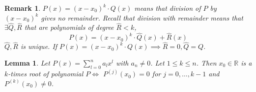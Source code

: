 \documentclass{article}
\newtheorem{lemma}{Lemma}  \numberwithin{lemma}{section}
\newtheorem{remark}{Remark}  \numberwithin{remark}{section}
\begin{document}
\begin{remark}
  $P(x) = (x - x_0)^k \cdot Q(x)$ means that division of $P$ by $(x - x_0)^k$ gives no remainder.
  Recall that division with remainder means that $\exists \hat Q, \hat R$ that are polynomials of degree $\hat R < k$,
  \[ P(x) = (x - x_0)^k \cdot \hat Q(x) + \hat R(x) \]
  $\hat Q, \hat R$ is unique.
  If $P(x) = (x - x_0)^k \cdot Q(x) \implies \hat R = 0, \hat Q = Q$.
\end{remark}

\begin{lemma} %
  \label{lemma2-2}
  Let $P(x) = \sum_{l=0}^n a_l x^l$ with $a_n \neq 0$.
  Let $1 \leq k \leq n$. Then $x_0 \in \mathbb R$ is a $k$-times root of polynomial $P \iff$
  $P^{(j)}(x_0) = 0$ for $j = 0, \ldots, k-1$ and $P^{(k)}(x_0) \neq 0$.
\end{lemma}
\end{document}
